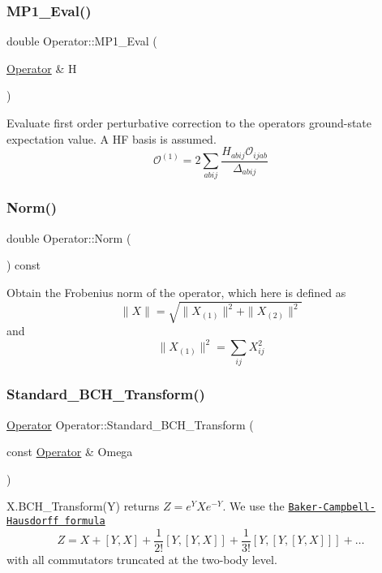 \subsubsection{\texorpdfstring{M\+P1\+\_\+\+Eval()}{MP1\_Eval()}}
{\footnotesize\ttfamily double Operator\+::\+M\+P1\+\_\+\+Eval (\begin{DoxyParamCaption}\item[{\hyperlink{classOperator}{Operator} \&}]{H }\end{DoxyParamCaption})}

Evaluate first order perturbative correction to the operator\textquotesingle{}s ground-\/state expectation value. A HF basis is assumed. \[ \mathcal{O}^{(1)} = 2\sum_{abij} \frac{H_{abij}\mathcal{O}_{ijab}}{\Delta_{abij}} \] \mbox{\label{classOperator_af8f53905406e3322abbc1a4c594c1d22}} 
\subsubsection{\texorpdfstring{Norm()}{Norm()}}
{\footnotesize\ttfamily double Operator\+::\+Norm (\begin{DoxyParamCaption}{ }\end{DoxyParamCaption}) const}

Obtain the Frobenius norm of the operator, which here is defined as \[ \|X\| = \sqrt{\|X_{(1)}\|^2 +\|X_{(2)}\|^2 } \] and \[ \|X_{(1)}\|^2 = \sum\limits_{ij} X_{ij}^2 \] \mbox{\label{classOperator_a9deea6699c1d3d39119bedeb1f53965e}} 
\subsubsection{\texorpdfstring{Standard\+\_\+\+B\+C\+H\+\_\+\+Transform()}{Standard\_BCH\_Transform()}}
{\footnotesize\ttfamily \hyperlink{classOperator}{Operator} Operator\+::\+Standard\+\_\+\+B\+C\+H\+\_\+\+Transform (\begin{DoxyParamCaption}\item[{const \hyperlink{classOperator}{Operator} \&}]{Omega }\end{DoxyParamCaption})}

X.\+B\+C\+H\+\_\+\+Transform(\+Y) returns $ Z = e^{Y} X e^{-Y} $. We use the \href{http://en.wikipedia.org/wiki/Baker-Campbell-Hausdorff_formula}{\tt Baker-\/\+Campbell-\/\+Hausdorff formula} \[ Z = X + [Y,X] + \frac{1}{2!}[Y,[Y,X]] + \frac{1}{3!}[Y,[Y,[Y,X]]] + \ldots \] with all commutators truncated at the two-\/body level. \mbox{\label{classOperator_ac2eb154c97ceff6f86cd3d24ddb4da1f}} 
